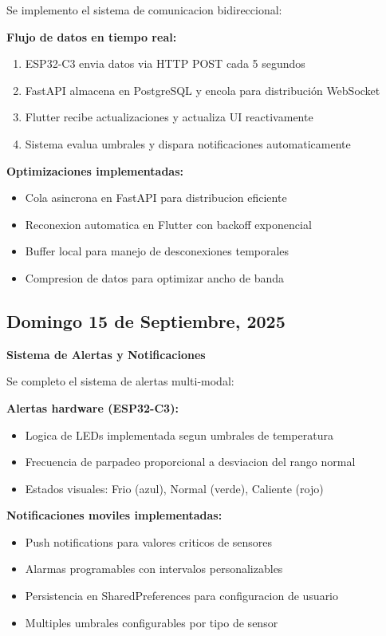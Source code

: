 \documentclass[11pt,letterpaper]{article}
\begin{document}
Se implemento el sistema de comunicacion bidireccional:

\textbf{Flujo de datos en tiempo real:}
\begin{enumerate}
    \item ESP32-C3 envia datos via HTTP POST cada 5 segundos
    \item FastAPI almacena en PostgreSQL y encola para distribución WebSocket
    \item Flutter recibe actualizaciones y actualiza UI reactivamente
    \item Sistema evalua umbrales y dispara notificaciones automaticamente
\end{enumerate}

\textbf{Optimizaciones implementadas:}
\begin{itemize}
    \item Cola asincrona en FastAPI para distribucion eficiente
    \item Reconexion automatica en Flutter con backoff exponencial
    \item Buffer local para manejo de desconexiones temporales
    \item Compresion de datos para optimizar ancho de banda
\end{itemize}

\subsection{Domingo 15 de Septiembre, 2025}
\textbf{Sistema de Alertas y Notificaciones}

Se completo el sistema de alertas multi-modal:

\textbf{Alertas hardware (ESP32-C3):}
\begin{itemize}
    \item Logica de LEDs implementada segun umbrales de temperatura
    \item Frecuencia de parpadeo proporcional a desviacion del rango normal
    \item Estados visuales: Frio (azul), Normal (verde), Caliente (rojo)
\end{itemize}

\textbf{Notificaciones moviles implementadas:}
\begin{itemize}
    \item Push notifications para valores criticos de sensores
    \item Alarmas programables con intervalos personalizables
    \item Persistencia en SharedPreferences para configuracion de usuario
    \item Multiples umbrales configurables por tipo de sensor
\end{itemize}
\end{document}
